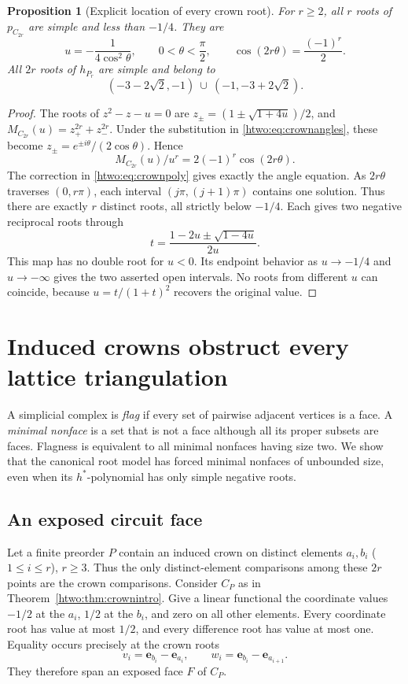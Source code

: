 \documentclass[11pt]{article}
\numberwithin{equation}{section}
\newtheorem{proposition}[theorem]{Proposition}
\theoremstyle{definition}
\newcommand{\ee}{\mathbf e}
\begin{document}
\begin{proposition}[Explicit location of every crown root]\label{htwo:prop:crownroots}
For $r\ge2$, all $r$ roots of $p_{C_{2r}}$ are simple and less than $-1/4$.
They are
\begin{equation}
 u=-\frac1{4\cos^2\theta},\qquad
 0<\theta<\frac\pi2,\qquad
 \cos(2r\theta)=\frac{(-1)^r}{2}.
 \label{htwo:eq:crownangles}
\end{equation}
All $2r$ roots of $h_{P_r}$ are simple and belong to
\[
 (-3-2\sqrt2,-1)\ \cup\ (-1,-3+2\sqrt2).
\]
\end{proposition}
\begin{proof}
The roots of $z^2-z-u=0$ are
$z_\pm=(1\pm\sqrt{1+4u})/2$, and
$M_{C_{2r}}(u)=z_+^{2r}+z_-^{2r}$. Under the substitution in
\eqref{htwo:eq:crownangles}, these become
$z_\pm=e^{\pm i\theta}/(2\cos\theta)$. Hence
\[
 M_{C_{2r}}(u)/u^r=2(-1)^r\cos(2r\theta).
\]
The correction in \eqref{htwo:eq:crownpoly} gives exactly the angle equation.
As $2r\theta$ traverses $(0,r\pi)$, each interval
$(j\pi,(j+1)\pi)$ contains one solution. Thus there are exactly $r$
distinct roots, all strictly below $-1/4$. Each gives two negative
reciprocal roots through
\[
 t=\frac{1-2u\pm\sqrt{1-4u}}{2u}.
\]
This map has no double root for $u<0$. Its endpoint behavior as
$u\to-1/4$ and $u\to-\infty$ gives the two asserted open intervals.
No roots from different $u$ can coincide, because $u=t/(1+t)^2$ recovers
the original value.
\end{proof}

\section{Induced crowns obstruct every lattice triangulation}\label{htwo:sec:obstructions}

A simplicial complex is \emph{flag} if every set of pairwise adjacent
vertices is a face. A \emph{minimal nonface} is a set that is not a face
although all its proper subsets are faces. Flagness is equivalent to all
minimal nonfaces having size two. We show that the canonical root model
has forced minimal nonfaces of unbounded size, even when its $h^*$-polynomial
has only simple negative roots.

\subsection{An exposed circuit face}

Let a finite preorder $P$ contain an induced crown on distinct elements
$a_i,b_i$ ($1\le i\le r$), $r\ge3$. Thus the only distinct-element
comparisons among these $2r$ points are the crown comparisons. Consider
$C_P$ as in Theorem~\ref{htwo:thm:crownintro}. Give a linear functional the
coordinate values $-1/2$ at the $a_i$, $1/2$ at the $b_i$, and zero on
all other elements. Every coordinate root has value at most $1/2$, and
every difference root has value at most one. Equality occurs precisely
at the crown roots
\begin{equation}
 v_i=\ee_{b_i}-\ee_{a_i},\qquad
 w_i=\ee_{b_i}-\ee_{a_{i+1}}.
 \label{htwo:eq:circuitvertices}
\end{equation}
They therefore span an exposed face $F$ of $C_P$.
\end{document}
